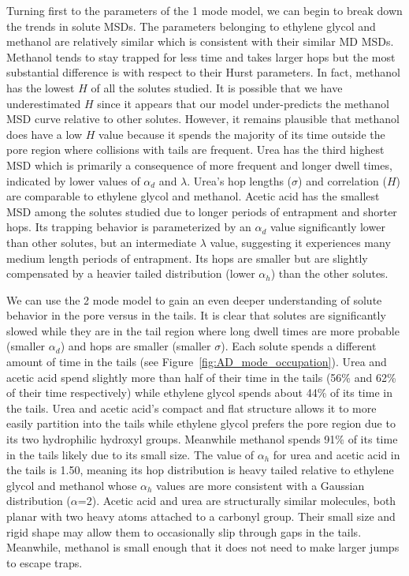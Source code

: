 \documentclass{article}
\begin{document}
  Turning first to the parameters of the 1 mode model, we can begin to break down the
  trends in solute MSDs. The parameters belonging to ethylene glycol and methanol are
  relatively similar which is consistent with their similar MD MSDs. Methanol 
  tends to stay trapped for less time and takes larger hops but the most substantial
  difference is with respect to their Hurst parameters. In fact, methanol has the lowest
  $H$ of all the solutes studied. It is possible that we have underestimated $H$ since 
  it appears that our model under-predicts the methanol MSD curve relative
  to other solutes. However, it remains plausible that methanol does have a low $H$ 
  value because it spends the majority of its time outside the pore region where collisions
  with tails are frequent. Urea has the third highest MSD which is primarily a consequence of
  more frequent and longer dwell times, indicated by lower values of $\alpha_d$ and 
  $\lambda$. Urea's hop lengths ($\sigma$) and correlation ($H$) are comparable to ethylene
  glycol and methanol. Acetic acid has the smallest MSD among the solutes studied due 
  to longer periods of entrapment and shorter hops. Its trapping behavior is parameterized
  by an $\alpha_d$ value significantly lower than other solutes, but an intermediate 
  $\lambda$ value, suggesting it experiences many medium length periods of entrapment. 
  Its hops are smaller but are slightly compensated by a heavier tailed distribution 
  (lower $\alpha_h$) than the other solutes. 
  
  We can use the 2 mode model to gain an even deeper understanding of solute behavior
  in the pore versus in the tails. It is clear that solutes are significantly slowed 
  while they are in the tail region where long dwell times are more probable
  (smaller $\alpha_d$) and hops are smaller (smaller $\sigma$). Each solute spends 
  a different amount of time in the tails (see Figure~\ref{fig:AD_mode_occupation}). 
  Urea and acetic acid spend slightly more than half of their time in the tails 
  (56\% and 62\% of their time respectively) while ethylene glycol spends about 
  44\% of its time in the tails. Urea and acetic acid's compact and flat structure 
  allows it to more easily partition into the tails while ethylene glycol prefers
  the pore region due to its two hydrophilic hydroxyl groups. Meanwhile methanol 
  spends 91\% of its time in the tails likely due to its small size.  
  The value of $\alpha_h$ for urea and acetic acid in the tails is 1.50, meaning its hop distribution
  is heavy tailed relative to ethylene glycol and methanol whose $\alpha_h$ values are
  more consistent with a Gaussian distribution ($\alpha$=2). Acetic acid and urea are
  structurally similar molecules, both planar with two heavy atoms attached to a 
  carbonyl group. Their small size and rigid shape may allow them to occasionally slip
  through gaps in the tails. Meanwhile, methanol is small enough that it does not need
  to make larger jumps to escape traps.
  
\end{document}
